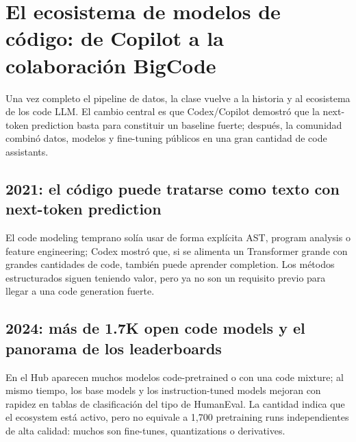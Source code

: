 \section{El ecosistema de modelos de código: de Copilot a la colaboración BigCode}

Una vez completo el pipeline de datos, la clase vuelve a la historia y al ecosistema de los code LLM. El cambio central es que Codex/Copilot demostró que la next-token prediction basta para constituir un baseline fuerte; después, la comunidad combinó datos, modelos y fine-tuning públicos en una gran cantidad de code assistants.

\subsection{2021: el código puede tratarse como texto con next-token prediction}

El code modeling temprano solía usar de forma explícita AST, program analysis o feature engineering; Codex mostró que, si se alimenta un Transformer grande con grandes cantidades de code, también puede aprender completion. Los métodos estructurados siguen teniendo valor, pero ya no son un requisito previo para llegar a una code generation fuerte.



\subsection{2024: más de 1.7K open code models y el panorama de los leaderboards}

En el Hub aparecen muchos modelos code-pretrained o con una code mixture; al mismo tiempo, los base models y los instruction-tuned models mejoran con rapidez en tablas de clasificación del tipo de HumanEval. La cantidad indica que el ecosystem está activo, pero no equivale a 1,700 pretraining runs independientes de alta calidad: muchos son fine-tunes, quantizations o derivatives.


